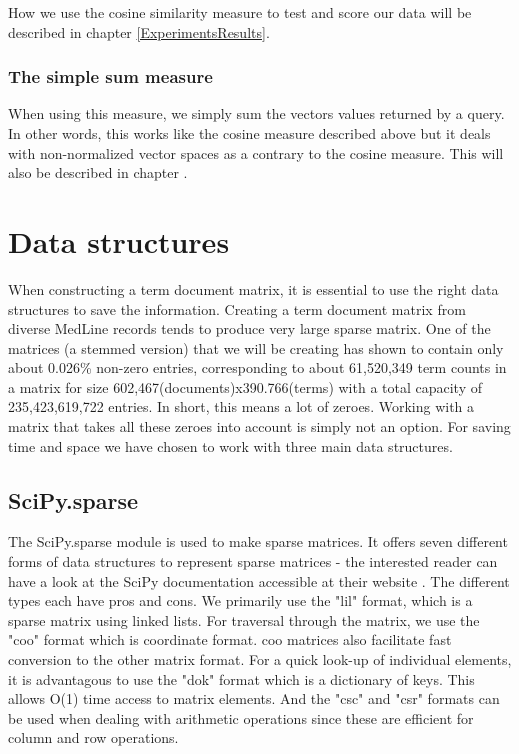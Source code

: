 How we use the cosine similarity measure to test and score our data
will be described in chapter \ref{ExperimentsResults}.


\subsubsection{The simple sum measure\label{SimpleSum}}
When using this measure, we simply sum the vectors values returned by
a query. In other words, this works like the cosine measure described
above but it deals with non-normalized vector spaces as a contrary to
the cosine measure. This will also be described in chapter
.

\section{Data structures}

When constructing a term document matrix, it is essential to use the
right data structures to save the information. Creating a term
document matrix from diverse MedLine records tends to produce very
large sparse matrix. One of the matrices (a stemmed version) that we
will be creating has shown to contain only about 0.026\% non-zero
entries, corresponding to about 61,520,349 term counts in a matrix for
size 602,467(documents)x390.766(terms) with a total capacity of
235,423,619,722 entries. In short, this means a lot of zeroes. Working
with a matrix that takes all these zeroes into account is simply not
an option. For saving time and space we have chosen to work with three
main data structures.

\subsection{SciPy.sparse\label{SciPy_sparse}}

The SciPy.sparse module is used to make sparse matrices. It offers
seven different forms of data structures to represent sparse matrices
- the interested reader can have a look at the SciPy documentation
accessible at their website \cite{SciPy}. The different types each have pros and
cons. We primarily use the "lil" format, which is a sparse matrix
using linked lists. For traversal through the matrix, we use the "coo"
format which is coordinate format. coo matrices also facilitate fast
conversion to the other matrix format. For a quick look-up of
individual elements, it is advantagous to use the "dok" format which
is a dictionary of keys. This allows O(1) time access to matrix
elements. And the "csc" and "csr" formats can be used when dealing
with arithmetic operations since these are efficient for column and
row operations.

